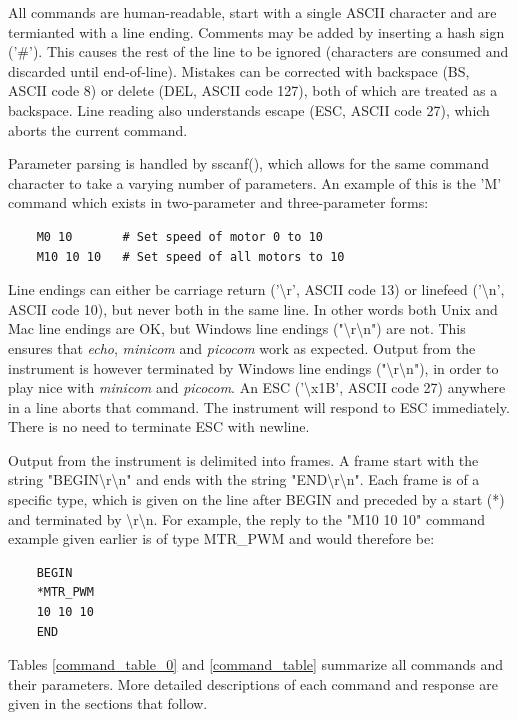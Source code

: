 \documentclass{article}
\begin{document}
All commands are human-readable, start with a single ASCII character and are termianted with a line ending.
Comments may be added by inserting a hash sign ('\#').
This causes the rest of the line to be ignored (characters are consumed and discarded until end-of-line).
Mistakes can be corrected with backspace (BS, ASCII code 8) or delete (DEL, ASCII code 127), both of which are treated as a backspace.
Line reading also understands escape (ESC, ASCII code 27), which aborts the current command.

Parameter parsing is handled by sscanf(), which allows for the same command character to take a varying number
of parameters. An example of this is the 'M' command which exists in two-parameter and three-parameter forms:

\begin{lstlisting}
    M0 10       # Set speed of motor 0 to 10
    M10 10 10   # Set speed of all motors to 10
\end{lstlisting}


Line endings can either be carriage return ('{\textbackslash}r', ASCII code 13) or linefeed ('{\textbackslash}n', ASCII code 10), but never both in the same line.
In other words both Unix and Mac line endings are OK, but Windows line endings ("{\textbackslash}r{\textbackslash}n") are not.
This ensures that {\it echo}, {\it minicom} and {\it picocom} work as expected.
Output from the instrument is however terminated by Windows line endings ("{\textbackslash}r{\textbackslash}n"), in order to play nice with {\it minicom} and {\it picocom}.
An ESC ('{\textbackslash}x1B', ASCII code 27) anywhere in a line aborts that command.
The instrument will respond to ESC immediately.
There is no need to terminate ESC with newline.

Output from the instrument is delimited into frames.
A frame start with the string "BEGIN{\textbackslash}r{\textbackslash}n" and ends with the string "END{\textbackslash}r{\textbackslash}n".
Each frame is of a specific type, which is given on the line after BEGIN and preceded by a start (*) and terminated by {\textbackslash}r{\textbackslash}n.
For example, the reply to the "M10 10 10" command example given earlier is of type MTR\_PWM and would therefore be:

\begin{lstlisting}
    BEGIN
    *MTR_PWM
    10 10 10
    END
\end{lstlisting}

Tables \ref{command_table_0} and \ref{command_table} summarize all commands and their parameters.
More detailed descriptions of each command and response are given in the sections that follow.
\end{document}
